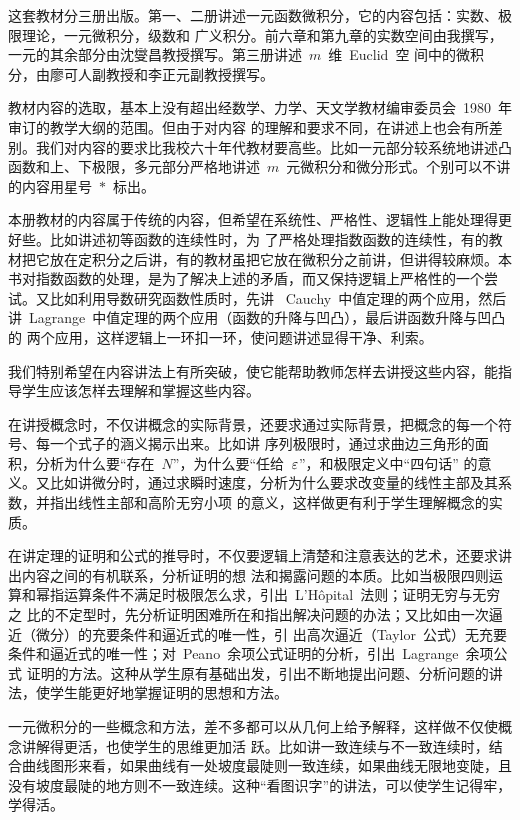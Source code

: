 
\begin{preface}
这套教材分三册出版。第一、二册讲述一元函数微积分，它的内容包括：实数、极限理论，一元微积分，级数和
广义积分。前六章和第九章的实数空间由我撰写，一元的其余部分由沈燮昌教授撰写。第三册讲述~$m$~维~Euclid~空
间中的微积分，由廖可人副教授和李正元副教授撰写。

教材内容的选取，基本上没有超出经数学、力学、天文学教材编审委员会~1980~年审订的教学大纲的范围。但由于对内容
的理解和要求不同，在讲述上也会有所差别。我们对内容的要求比我校六十年代教材要高些。比如一元部分较系统地讲述凸
函数和上、下极限，多元部分严格地讲述~$m$~元微积分和微分形式。个别可以不讲的内容用星号~$\ast$~标出。

本册教材的内容属于传统的内容，但希望在系统性、严格性、逻辑性上能处理得更好些。比如讲述初等函数的连续性时，为
了严格处理指数函数的连续性，有的教材把它放在定积分之后讲，有的教材虽把它放在微积分之前讲，但讲得较麻烦。本
书对指数函数的处理，是为了解决上述的矛盾，而又保持逻辑上严格性的一个尝试。又比如利用导数研究函数性质时，先讲
~Cauchy~中值定理的两个应用，然后讲~Lagrange~中值定理的两个应用（函数的升降与凹凸），最后讲函数升降与凹凸的
两个应用，这样逻辑上一环扣一环，使问题讲述显得干净、利索。

我们特别希望在内容讲法上有所突破，使它能帮助教师怎样去讲授这些内容，能指导学生应该怎样去理解和掌握这些内容。

在讲授概念时，不仅讲概念的实际背景，还要求通过实际背景，把概念的每一个符号、每一个式子的涵义揭示出来。比如讲
序列极限时，通过求曲边三角形的面积，分析为什么要“存在~$N$”，为什么要“任给~$\varepsilon$”，和极限定义中“四句话”%
的意义。又比如讲微分时，通过求瞬时速度，分析为什么要求改变量的线性主部及其系数，并指出线性主部和高阶无穷小项
的意义，这样做更有利于学生理解概念的实质。

在讲定理的证明和公式的推导时，不仅要逻辑上清楚和注意表达的艺术，还要求讲出内容之间的有机联系，分析证明的想
法和揭露问题的本质。比如当极限四则运算和幂指运算条件不满足时极限怎么求，引出~L'H\^opital~法则；证明无穷与无穷之
比的不定型时，先分析证明困难所在和指出解决问题的办法；又比如由一次逼近（微分）的充要条件和逼近式的唯一性，引
出高次逼近（Taylor~公式）无充要条件和逼近式的唯一性；对~Peano~余项公式证明的分析，引出~Lagrange~余项公式
证明的方法。这种从学生原有基础出发，引出不断地提出问题、分析问题的讲法，使学生能更好地掌握证明的思想和方法。

一元微积分的一些概念和方法，差不多都可以从几何上给予解释，这样做不仅使概念讲解得更活，也使学生的思维更加活
跃。比如讲一致连续与不一致连续时，结合曲线图形来看，如果曲线有一处坡度最陡则一致连续，如果曲线无限地变陡，且
没有坡度最陡的地方则不一致连续。这种“看图识字”的讲法，可以使学生记得牢，学得活。


\end{preface}
